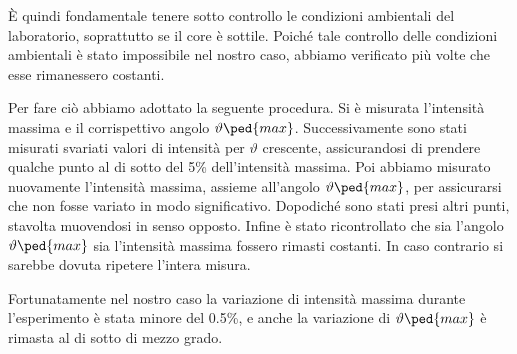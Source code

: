 È quindi fondamentale tenere sotto controllo le condizioni ambientali del laboratorio, soprattutto se il core è sottile. Poiché tale controllo delle condizioni ambientali è stato impossibile nel nostro caso, abbiamo verificato più volte che esse rimanessero costanti.

Per fare ciò abbiamo adottato la seguente procedura. Si è misurata l'intensità massima e il corrispettivo angolo $\vartheta\ped{max}$.
Successivamente sono stati misurati svariati valori di intensità per $\vartheta$ crescente, assicurandosi di prendere qualche punto
al di sotto del 5\% dell'intensità massima. Poi abbiamo misurato nuovamente l'intensità massima, assieme all'angolo $\vartheta\ped{max}$,
per assicurarsi che non fosse variato in modo significativo. Dopodiché sono stati presi altri punti, stavolta muovendosi in senso opposto.
Infine è stato ricontrollato che sia l'angolo $\vartheta\ped{max}$ sia l'intensità massima fossero rimasti costanti. In caso
contrario si sarebbe dovuta ripetere l'intera misura.

Fortunatamente nel nostro caso la variazione di intensità massima durante l'esperimento è stata minore del 0.5\%, e anche la variazione
di $\vartheta\ped{max}$ è rimasta al di sotto di mezzo grado. 
